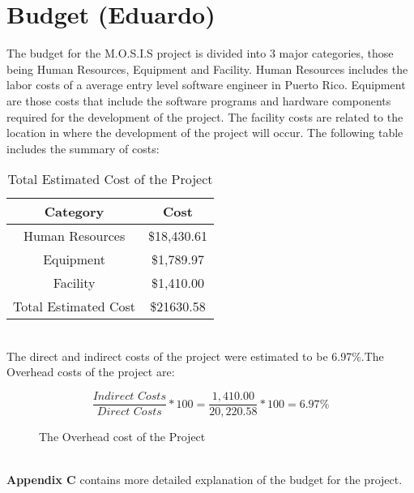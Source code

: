 
 \section{Budget (Eduardo)}
 The budget for the M.O.S.I.S project is divided into 3 major categories, those being Human Resources, Equipment and Facility. Human Resources includes the labor costs of a average entry level software engineer in Puerto Rico\cite{SoftwareEngineerSalary}. Equipment are those costs that include the software programs and hardware components required for the development of the project. The facility costs are related to the location in where the development of the project will occur. The following table includes the summary of costs:
 \begin{table}[h]
    \centering
    \begin{tabular}{||c | c||} 
     \hline
     Category & Cost \\ [0.5ex] 
     \hline\hline
     Human Resources & \$18,430.61\\ 
     \hline
     Equipment & \$1,789.97\\
     \hline
     Facility & \$1,410.00\\
     \hline
     Total Estimated Cost & \$21630.58 \\
     \hline
    \end{tabular}
    \caption {Total Estimated Cost of the Project}
    \label {table:1}
\end{table}
\\ The direct and indirect costs of the project were estimated to be 6.97\%.The Overhead costs of the project are:
\begin{figure}[h]
   $$\frac{\textit{Indirect Costs}}{\textit{Direct Costs}} * 100 = \frac{1,410.00}{20,220.58} * 100 = 6.97\%$$
\caption{The Overhead cost of the Project}
\end{figure}
\\\textbf{Appendix C} contains more detailed explanation of the budget for the project.